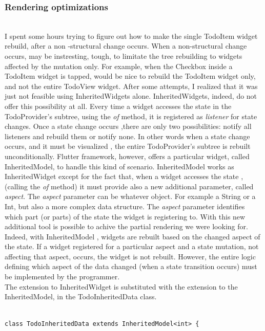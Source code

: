 \subsubsection{Rendering optimizations} 
\label{subpar:render_optimizations_inherited_widget}
\hfill\\
I spent some hours trying to figure out how to make the single TodoItem widget rebuild, after a non -structural change occurs. When a non-structural change occurs, may be instresting, tough, to limitate the tree rebuilding  to widgets affected by the mutation only. For example, when the Checkbox inside a TodoItem widget is tapped, would be nice to rebuild the TodoItem widget only, and not the entire TodoView widget. After some attempts, I realized that it was just not feasible using InheritedWidgets alone. InheritedWidgets, indeed, do not offer this possibility at all. Every time a widget accesses the state in the TodoProvider’s subtree, using the \textit{of} method, it is registered as \textit{listener} for state changes. Once a state change occurs ,there are only two possibilities: notify all listeners and rebuild them or notify none. In other words when a state change occurs, and it must be visualized , the entire TodoProvider’s subtree is rebuilt unconditionally. Flutter framework, however, offers a particular widget, called InheritedModel, to handle this kind of scenario. InheritedModel works as InheritedWidget except for the fact that, when a widget accesses the state ,(calling the \textit{of} method) it must provide also a new additional parameter, called \textit{aspect}. The \textit{aspect} parameter can be whatever object. For example a String or a Int, but also a more complex data structure. The \textit{aspect} parameter identifies which part (or parts) of the state the widget is registering to. 
With this new additional tool is possible to achive the partial rendering we were looking for. Indeed, with InheritedModel , widgets are rebuilt based on the changed aspect of the state. If a widget registered for a particular aspect and a state mutation, not affecting that aspect, occurs, the widget is not rebuilt. However, the entire logic defining which aspect of the data changed (when a state transition occurs) must be implemented by the programmer.\\
The extension to InheritedWidget is substituted with the extension to the InheritedModel, in the
TodoInheritedData class.
\mbox{}\\
\begin{code}
\mbox{}
\label{code:2.44}
\begin{verbatim}

class TodoInheritedData extends InheritedModel<int> {
\end{verbatim}
\end{code}
